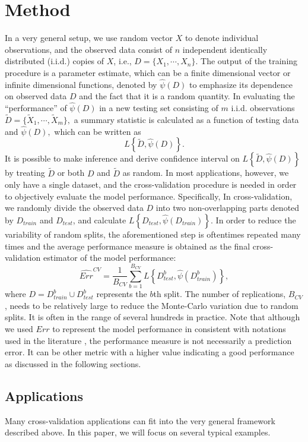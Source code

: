 \documentclass[12pt]{article}
\begin{document}
\section{Method}
In a very general setup, we use random vector $X$ to denote individual observations, and the observed data consist of $n$ independent identically distributed (i.i.d.) copies of $X$, i.e., $D=\{X_1,\cdots, X_n\}.$ The output of the training procedure is a parameter estimate, which can be a finite dimensional vector or infinite dimensional functions, denoted by $\hat{\psi}(D)$ to emphasize its dependence on observed data $D$ and the fact that it is a random quantity. In evaluating the ``performance'' of $\hat{\psi}(D)$ in a new testing set consisting of $m$ i.i.d.  observations $\widetilde{D}=\{\widetilde{X}_1, \cdots, \widetilde{X}_m\},$ a summary statistic is calculated as a function of testing data and $\hat{\psi}(D),$ which can be written as 
$$L\left\{\widetilde{D}, \hat{\psi}(D)\right\}.$$
It is possible to make inference and derive confidence interval on $L\left\{\widetilde{D}, \hat{\psi}(D)\right\}$ by treating $\widetilde{D}$ or both $D$ and $\widetilde{D}$ as random. In most applications, however, we only have a single dataset, and the cross-validation procedure is needed in order to objectively evaluate the model performance. Specifically,  In cross-validation, we randomly divide the observed data $D$ into two non-overlapping parts denoted by $D_{train}$ and $D_{test}$, and calculate 
$L\left\{D_{test}, \hat{\psi}(D_{train})\right\}.$ In order to reduce the variability of random splits, the aforementioned step is oftentimes repeated many times and the average performance measure is obtained as the final cross-validation estimator of the model performance:
$$ \widehat{Err}^{CV}=\frac{1}{B_{CV}}\sum_{b=1}^{B_{CV}} L\left\{D_{test}^b, \hat{\psi}(D_{train}^b)\right\},$$
where $D=D_{train}^b\cup D_{test}^b$ represents the $b$th split. The number of replications, $B_{CV}$, needs to be relatively large to reduce the Monte-Carlo variation due to random splits. It is often in the range of several hundreds in practice. Note that although we used $Err$ to represent the model performance in consistent with notations used in the literature \cite{bates2021cross}, the performance measure is not necessarily a prediction error. It can be other metric with a higher value indicating a good performance as discussed in the following sections.

\subsection{Applications}
Many cross-validation applications can fit into the very general framework described above.  In this paper, we will focus on several typical examples. 
\end{document}
